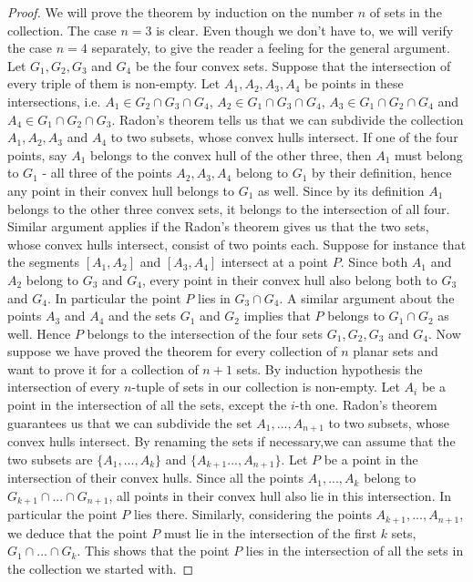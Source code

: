 \begin{proof}
We will prove the theorem by induction on the number $n$ of sets in the collection. The case $n=3$ is clear. Even though we don't have to, we will verify the case $n=4$ separately, to give the reader a feeling for the general argument.
Let $G_1,G_2,G_3$ and $G_4$ be the four convex sets. Suppose that the intersection of every triple of them is non-empty. Let $A_1,A_2,A_3,A_4$ be points in these intersections, i.e. $A_1\in G_2\cap G_3 \cap G_4$, $A_2 \in G_1\cap G_3 \cap G_4$, $A_3 \in G_1\cap G_2 \cap G_4$ and $A_4 \in G_1\cap G_2 \cap G_3$. Radon's theorem tells us that we can subdivide the collection $A_1,A_2,A_3$ and $A_4$ to two subsets, whose convex hulls intersect. If one of the four points, say $A_1$ belongs to the convex hull of the other three, then $A_1$ must belong to $G_1$ - all three of the points $A_2,A_3,A_4$ belong to $G_1$ by their definition, hence any point in their convex hull belongs to $G_1$ as well. Since by its definition $A_1$ belongs to the other three convex sets, it belongs to the intersection of all four.
Similar argument applies if the Radon's theorem gives us that the two sets, whose convex hulls intersect, consist of two points each. Suppose for instance that the segments $[A_1,A_2]$ and $[A_3,A_4]$ intersect at a point $P$. Since both $A_1$ and $A_2$ belong to $G_3$ and $G_4$, every point in their convex hull also belong both to $G_3$ and $G_4$. In particular the point $P$ lies in $G_3\cap G_4$. A similar argument about the points $A_3$ and $A_4$ and the sets $G_1$ and $G_2$ implies that $P$ belongs to $G_1\cap G_2$ as well. Hence $P$ belongs to the intersection of the four sets $G_1,G_2,G_3$ and $G_4$.
Now suppose we have proved the theorem for every collection of $n$ planar sets and want to prove it for a collection of $n+1$ sets. By induction hypothesis the intersection of every $n$-tuple of sets in our collection is non-empty. Let $A_i$ be a point in the intersection of all the sets, except the $i$-th one. Radon's theorem guarantees us that we can subdivide the set $A_1,...,A_{n+1}$ to two subsets, whose convex hulls intersect. By renaming the sets if necessary,we can assume that the two subsets are $\{A_1,...,A_k\}$ and $\{A_{k+1}...,A_{n+1}\}$. Let $P$ be a point in the intersection of their convex hulls. Since all the points $A_1,...,A_k$ belong to $G_{k+1}\cap...\cap G_{n+1}$, all points in their convex hull also lie in this intersection. In particular the point $P$ lies there. Similarly, considering the points $A_{k+1},...,A_{n+1}$, we deduce that the point $P$ must lie in the intersection of the first $k$ sets, $G_1\cap...\cap G_k$. This shows that the point $P$ lies in the intersection of all the sets in the collection we started with.
\end{proof}
